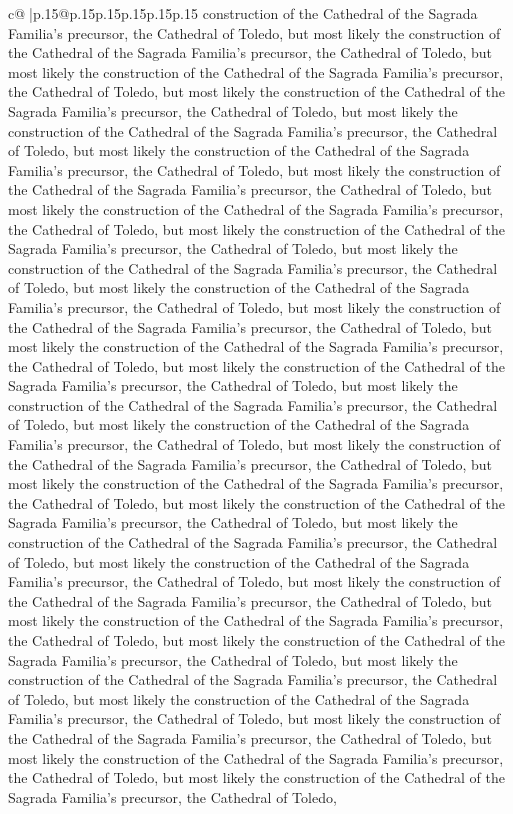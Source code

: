 \documentclass{article}
\begin{document}
{\begin{supertabular}{c@{$\;$}|p{.15\linewidth}@{}p{.15\linewidth}p{.15\linewidth}p{.15\linewidth}p{.15\linewidth}p{.15\linewidth}}
{{{construction of the Cathedral of the Sagrada Familia's precursor, the Cathedral of Toledo, but most likely the construction of the Cathedral of the Sagrada Familia's precursor, the Cathedral of Toledo, but most likely the construction of the Cathedral of the Sagrada Familia's precursor, the Cathedral of Toledo, but most likely the construction of the Cathedral of the Sagrada Familia's precursor, the Cathedral of Toledo, but most likely the construction of the Cathedral of the Sagrada Familia's precursor, the Cathedral of Toledo, but most likely the construction of the Cathedral of the Sagrada Familia's precursor, the Cathedral of Toledo, but most likely the construction of the Cathedral of the Sagrada Familia's precursor, the Cathedral of Toledo, but most likely the construction of the Cathedral of the Sagrada Familia's precursor, the Cathedral of Toledo, but most likely the construction of the Cathedral of the Sagrada Familia's precursor, the Cathedral of Toledo, but most likely the construction of the Cathedral of the Sagrada Familia's precursor, the Cathedral of Toledo, but most likely the construction of the Cathedral of the Sagrada Familia's precursor, the Cathedral of Toledo, but most likely the construction of the Cathedral of the Sagrada Familia's precursor, the Cathedral of Toledo, but most likely the construction of the Cathedral of the Sagrada Familia's precursor, the Cathedral of Toledo, but most likely the construction of the Cathedral of the Sagrada Familia's precursor, the Cathedral of Toledo, but most likely the construction of the Cathedral of the Sagrada Familia's precursor, the Cathedral of Toledo, but most likely the construction of the Cathedral of the Sagrada Familia's precursor, the Cathedral of Toledo, but most likely the construction of the Cathedral of the Sagrada Familia's precursor, the Cathedral of Toledo, but most likely the construction of the Cathedral of the Sagrada Familia's precursor, the Cathedral of Toledo, but most likely the construction of the Cathedral of the Sagrada Familia's precursor, the Cathedral of Toledo, but most likely the construction of the Cathedral of the Sagrada Familia's precursor, the Cathedral of Toledo, but most likely the construction of the Cathedral of the Sagrada Familia's precursor, the Cathedral of Toledo, but most likely the construction of the Cathedral of the Sagrada Familia's precursor, the Cathedral of Toledo, but most likely the construction of the Cathedral of the Sagrada Familia's precursor, the Cathedral of Toledo, but most likely the construction of the Cathedral of the Sagrada Familia's precursor, the Cathedral of Toledo, but most likely the construction of the Cathedral of the Sagrada Familia's precursor, the Cathedral of Toledo, but most likely the construction of the Cathedral of the Sagrada Familia's precursor, the Cathedral of Toledo, but most likely the construction of the Cathedral of the Sagrada Familia's precursor, the Cathedral of Toledo, but most likely the construction of the Cathedral of the Sagrada Familia's precursor, the Cathedral of Toledo, but most likely the construction of the Cathedral of the Sagrada Familia's precursor, the Cathedral of Toledo, }}}
\end{supertabular}}
\end{document}
